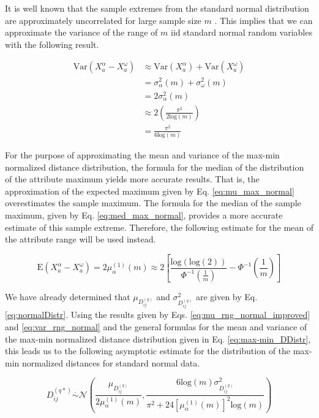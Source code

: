 \documentclass[10pt,letterpaper]{article}\usepackage[]{graphicx}\usepackage[]{color}
\begin{document}
It is well known that the sample extremes from the standard normal distribution are approximately uncorrelated for large sample size $m$ \cite{gumbel1947}. This implies that we can approximate the variance of the range of $m$ iid standard normal random variables with the following result.

\begin{equation}\label{eq:var_rng_normal}
\begin{aligned}
\text{Var}(X^\alpha_a - X^\omega_a) &\approx \text{Var}(X^\alpha_a) + \text{Var}(X^\omega_a) \\
&= \sigma^2_\alpha(m) + \sigma^2_\omega(m) \\
&= 2\sigma^2_\alpha(m) \\
&\approx 2\left(\frac{\pi^2}{2\text{log}(m)}\right) \\
&= \frac{\pi^2}{6\text{log}(m)}
\end{aligned}
\end{equation}

For the purpose of approximating the mean and variance of the max-min normalized distance distribution, the formula for the median of the distribution of the attribute maximum yields more accurate results. That is, the approximation of the expected maximum given by Eq. \ref{eq:mu_max_normal} overestimates the sample maximum. The formula for the median of the sample maximum, given by Eq. \ref{eq:med_max_normal}, provides a more accurate estimate of this sample extreme. Therefore, the following estimate for the mean of the attribute range will be used instead.

\begin{equation}\label{eq:mu_rng_normal_improved}
\text{E}(X^\alpha_a - X^\omega_a) = 2\mu^{(1)}_\alpha(m) \approx 2\left[\frac{\text{log}(\text{log}(2))}{\Phi^{-1}\left(\frac{1}{m}\right)} - \Phi^{-1}\left(\frac{1}{m}\right)\right]
\end{equation}

  We have already determined that $\mu_{D^{(q)}_{ij}}$ and $\sigma^2_{D^{(q)}_{ij}}$ are given by Eq. \ref{eq:normalDistr}. Using the results given by Eqs. \ref{eq:mu_rng_normal_improved} and \ref{eq:var_rng_normal} and the general formulas for the mean and variance of the max-min normalized distance distribution given in Eq. \ref{eq:max-min_DDistr}, this leads us to the following asymptotic estimate for the distribution of the max-min normalized distances for standard normal data.

\begin{equation}\label{eq:max-min_DDistr_normal}
D^{(q*)}_{ij} \overset{.}{\sim} \mathcal{N}\left(\frac{\mu_{D^{(q)}_{ij}}}{2\mu^{(1)}_\alpha(m)}, \frac{6 \text{log}(m) \sigma^2_{D^{(q)}_{ij}}}{\pi^2 + 24 \left[\mu^{(1)}_\alpha(m)\right]^2 \text{log}(m)}\right)
\end{equation}
\end{document}
